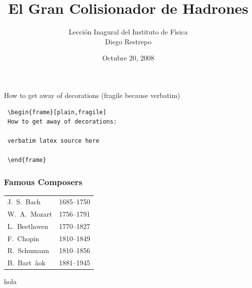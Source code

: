\documentclass[%
xcolor=pdftex,dvipsnames,table%
]{beamer}
\title[LHC] %
{El Gran Colisionador de Hadrones}
\author[GFIF] %
{{Lecci\'on Inagural del Instituto de F\'\i sica}\\
\vspace{2cm}
Diego Restrepo\inst{1} }
\institute[UdeA] %
{
  \inst{1}%
Instituto de F\'\i sica\\
Universidad de Antioquia
}
\date[] %
{Octubre 20, 2008}
\begin{document}
\begin{frame}
  \titlepage
\end{frame}

\begin{frame}
  How to get away of decorations (fragile because verbatim)
\begin{verbatim}
 \begin{frame}[plain,fragile]
 How to get away of decorations:

 verbatim latex source here

 \end{frame}
\end{verbatim}
  
\end{frame}


\begin{frame}
\frametitle{Famous Composers}
\begin{center}
\begin{tabular}{|l|c|}\hline
J.\ S.\ Bach & 1685--1750 \\
W.\ A.\ Mozart & 1756--1791 \\
L.\ Beethoven & 1770--1827 \\
F.\ Chopin & 1810--1849 \\
R.\ Schumann & 1810--1856 \\
B.\ Bart\ \^a{o}k & 1881--1945 \\ \hline
\end{tabular}
\end{center}
\end{frame}


{

 \begin{frame}
   hola
 \end{frame}
}
\end{document}
